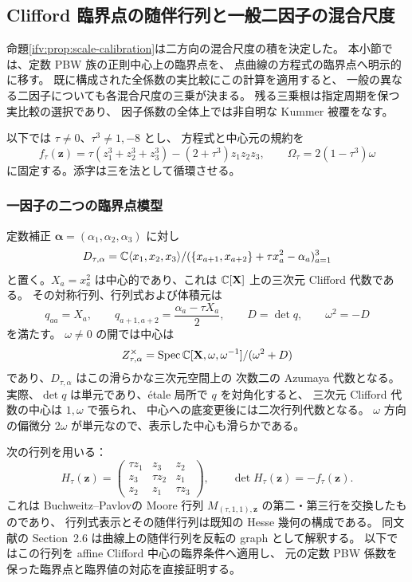 \subsection{Clifford 臨界点の随伴行列と一般二因子の混合尺度}
\label{ifm:subsec:scale}

命題\ref{ifv:prop:scale-calibration}は二方向の混合尺度の積を決定した。
本小節では、定数 PBW 族の正則中心上の臨界点を、
点曲線の方程式の臨界点へ明示的に移す。
既に構成された全係数の実比較にこの計算を適用すると、
一般の異なる二因子についても各混合尺度の三乗が決まる。
残る三乗根は指定周期を保つ実比較の選択であり、
因子係数の全体上では非自明な Kummer 被覆をなす。

以下では $\tau\ne0$、$\tau^3\ne1,-8$ とし、
方程式と中心元の規約を
\[
 f_\tau(\mathbf z)=\tau(z_1^3+z_2^3+z_3^3)
                   -(2+\tau^3)z_1z_2z_3,
 \qquad \Omega_\tau=2(1-\tau^3)\omega
\]
に固定する。添字は三を法として循環させる。

\subsubsection{一因子の二つの臨界点模型}

定数補正 $\boldsymbol\alpha=(\alpha_1,\alpha_2,\alpha_3)$ に対し
\[
 D_{\tau,\alpha}
  =\mathbb C\langle x_1,x_2,x_3\rangle/
       (\{x_{a+1},x_{a+2}\}+\tau x_a^2-\alpha_a)_{a=1}^3
\]
と置く。$X_a=x_a^2$ は中心的であり、これは
$\mathbb C[\mathbf X]$ 上の三次元 Clifford 代数である。
その対称行列、行列式および体積元は
\begin{equation}\label{ifm:eq:clifford-data}
 q_{aa}=X_a,\qquad
 q_{a+1,a+2}=\frac{\alpha_a-\tau X_a}{2},\qquad
 D=\det q,\qquad \omega^2=-D
\end{equation}
を満たす。
$\omega\ne0$ の開では中心は
\[
 Z_{\tau,\alpha}^{\times}
   =\operatorname{Spec}\mathbb C[\mathbf X,\omega,\omega^{-1}]/(\omega^2+D)
\]
であり、$D_{\tau,\alpha}$ はこの滑らかな三次元空間上の
次数二の Azumaya 代数となる。
実際、$\det q$ は単元であり、\'etale 局所で $q$ を対角化すると、
三次元 Clifford 代数の中心は $1,\omega$ で張られ、
中心への底変更後には二次行列代数となる。
$\omega$ 方向の偏微分 $2\omega$ が単元なので、表示した中心も滑らかである。

次の行列を用いる：
\begin{equation}\label{ifm:eq:hesse-matrix}
 H_\tau(\mathbf z)=
 \begin{pmatrix}
 \tau z_1&z_3&z_2\\
 z_3&\tau z_2&z_1\\
 z_2&z_1&\tau z_3
 \end{pmatrix},\qquad
                 \det H_\tau(\mathbf z)=-f_\tau(\mathbf z).
\end{equation}
これは Buchweitz--Pavlov\cite[Section~2.1]{IFMBuchweitzPavlov}の
Moore 行列 $M_{(\tau,1,1),\mathbf z}$ の第二・第三行を交換したものであり、
行列式表示とその随伴行列は既知の Hesse 幾何の構成である。
同文献の Section~2.6 は曲線上の随伴行列を反転の graph として解釈する。
以下ではこの行列を affine Clifford 中心の臨界条件へ適用し、
元の定数 PBW 係数を保った臨界点と臨界値の対応を直接証明する。

